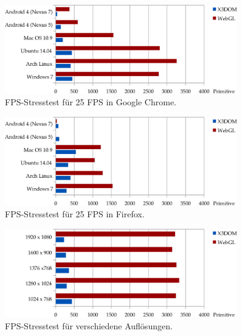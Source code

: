 \begin{figure}[p]
	\centering
	\includegraphics[width=0.9\textwidth]{kap5/figures/test-fps-all-os-chrome-crop.pdf}
	\vspace{0.75ex}
	\caption{FPS-Stresstest für 25 FPS in Google Chrome.}
	\label{FIG:GEOMETRY_TEST_CHROME}
\end{figure}

\begin{figure}[p]
	\centering
	\includegraphics[width=0.9\textwidth]{kap5/figures/test-fps-all-os-ff-crop.pdf}
	\vspace{0.75ex}
	\caption{FPS-Stresstest für 25 FPS in Firefox.}
	\label{FIG:GEOMETRY_TEST_FIREFOXL}
\end{figure}

\begin{figure}[p]
	\centering
	\includegraphics[width=0.9\textwidth]{kap5/figures/test-fps-all-res-chrome-crop.pdf}
	\vspace{0.75ex}
	\caption{FPS-Stresstest für verschiedene Auflösungen.}
	\label{FIG:GEOMETRY_RESOLUTION_TEST_CHROME}
\end{figure}

